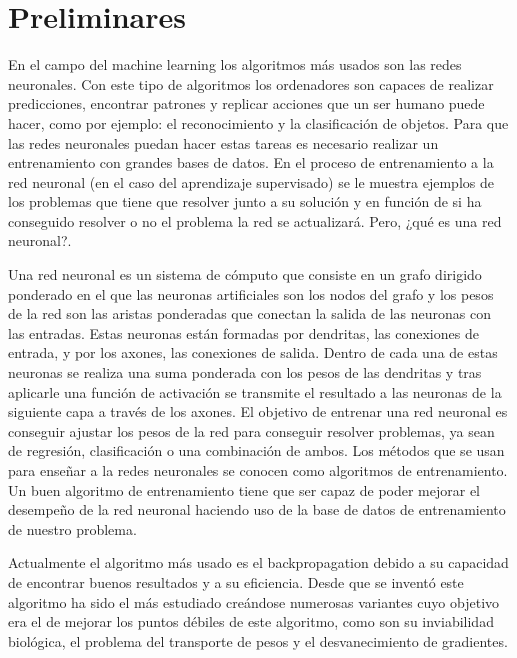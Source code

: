 \chapter{Preliminares}
En el campo del machine learning los algoritmos más usados son las redes neuronales. Con este tipo de algoritmos los ordenadores son capaces de realizar predicciones, encontrar patrones y replicar acciones que un ser humano puede hacer, como por ejemplo: el reconocimiento y la clasificación de objetos. Para que las redes neuronales puedan hacer estas tareas es necesario realizar un entrenamiento con grandes bases de datos. En el proceso de entrenamiento a la red neuronal (en el caso del aprendizaje supervisado) se le muestra ejemplos de los problemas que tiene que resolver junto a su solución y en función de si ha conseguido resolver o no el problema la red se actualizará. Pero, ¿qué es una red neuronal?.

Una red neuronal \cite{RefWorks:RefID:22-jain1996artificial} es un sistema de cómputo que consiste en un grafo dirigido ponderado en el que las neuronas artificiales son los nodos del grafo y los pesos de la red son las  aristas ponderadas que conectan la salida de las neuronas con las entradas. Estas neuronas están formadas por dendritas, las conexiones de entrada, y por los axones, las conexiones de salida. Dentro de cada una de estas neuronas se realiza una suma ponderada con los pesos de las dendritas y tras aplicarle una función de activación se transmite el resultado a las neuronas de la siguiente capa a través de los axones. El objetivo de entrenar una red neuronal es conseguir ajustar los pesos de la red para conseguir resolver problemas, ya sean de regresión, clasificación o una combinación de ambos. Los métodos que se usan para enseñar a la redes neuronales se conocen como algoritmos de entrenamiento. Un buen algoritmo de entrenamiento tiene que ser capaz de poder mejorar el desempeño de la red neuronal haciendo uso de la base de datos de entrenamiento de nuestro problema.

Actualmente el algoritmo más usado es el backpropagation \cite{RefWorks:RefID:6-rumelhart1986learning} debido a su capacidad de encontrar buenos resultados y a su eficiencia. Desde que se inventó este algoritmo ha sido el más estudiado creándose numerosas variantes cuyo objetivo era el de mejorar los puntos débiles de este algoritmo, como son su inviabilidad biológica, el problema del transporte de pesos \cite{RefWorks:RefID:10-grossberg1987competitive} y el desvanecimiento de gradientes.

